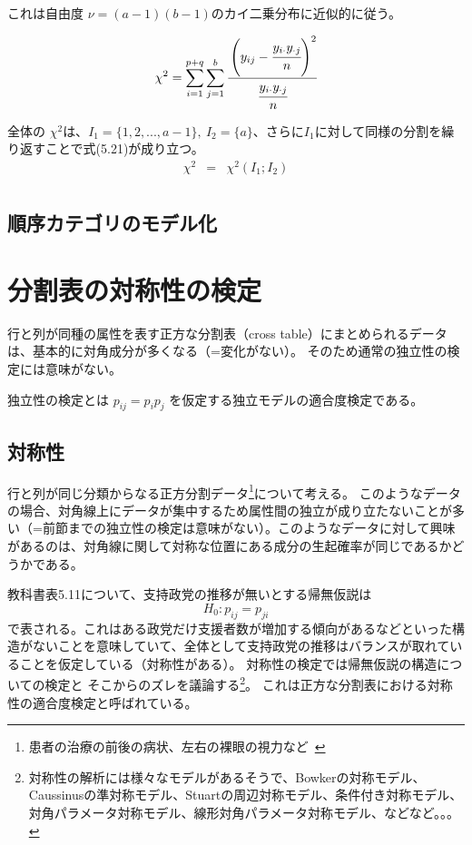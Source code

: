 \documentclass[10pt, a4paper]{ltjsarticle}
\begin{document}
これは自由度 $\nu=(a-1)(b-1)$のカイ二乗分布に近似的に従う。

\begin{eqnarray}
  \chi^2 = \sum_{i=1}^{p+q}\sum_{j=1}^b \cfrac{\left(y_{ij} - \cfrac{y_{i\cdot}y_{\cdot j}}{n} \right)^2}{\cfrac{y_{i\cdot}y_{\cdot j}}{n}}
\end{eqnarray}

全体の $\chi^2$は、$I_1=\{1,2,...,a-1\},~I_2=\{a\}$、さらに$I_1$に対して同様の分割を繰り返すことで式(5.21)が成り立つ。
\begin{eqnarray}
  \chi^2 &=& \chi^2(I_1; I_2) \\ 
\end{eqnarray} 



\subsection{順序カテゴリのモデル化}




\newpage

\section{分割表の対称性の検定}


行と列が同種の属性を表す正方な分割表（cross table）にまとめられるデータは、基本的に対角成分が多くなる（=変化がない）。
そのため通常の独立性の検定には意味がない。


独立性の検定とは $p_{ij} = p_ip_j$ を仮定する独立モデルの適合度検定である。



\subsection{対称性}

行と列が同じ分類からなる正方分割データ\footnote{患者の治療の前後の病状、左右の裸眼の視力など~\cite{hirotsu}}について考える。
このようなデータの場合、対角線上にデータが集中するため属性間の独立が成り立たないことが多い（=前節までの独立性の検定は意味がない）。このようなデータに対して興味があるのは、対角線に関して対称な位置にある成分の生起確率が同じであるかどうかである。

教科書表5.11について、支持政党の推移が無いとする帰無仮説は
\begin{equation}
  H_0 : p_{ij} = p_{ji}
\end{equation}
で表される。これはある政党だけ支援者数が増加する傾向があるなどといった構造がないことを意味していて、全体として支持政党の推移はバランスが取れていることを仮定している（対称性がある）。
対称性の検定では帰無仮説の構造についての検定と
そこからのズレを議論する\footnote{対称性の解析には様々なモデルがあるそうで、Bowkerの対称モデル、Caussinusの準対称モデル、Stuartの周辺対称モデル、条件付き対称モデル、対角パラメータ対称モデル、線形対角パラメータ対称モデル、などなど。。。}。
これは正方な分割表における対称性の適合度検定と呼ばれている。
\end{document}
